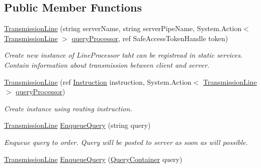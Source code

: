 \subsection*{Public Member Functions}
\begin{DoxyCompactItemize}
\item 
\mbox{\hyperlink{class_pipes_provider_1_1_client_1_1_transmission_line_a8fe76e563974e7380fe2f717e48d694e}{Transmission\+Line}} (string server\+Name, string server\+Pipe\+Name, System.\+Action$<$ \mbox{\hyperlink{class_pipes_provider_1_1_client_1_1_transmission_line}{Transmission\+Line}} $>$ \mbox{\hyperlink{class_pipes_provider_1_1_client_1_1_transmission_line_a86f49118056ad8cb6fe383abb2a350e8}{query\+Processor}}, ref Safe\+Access\+Token\+Handle token)
\begin{DoxyCompactList}\small\item\em Create new instance of Line\+Processor taht can be registread in static services. Contain information about transmission between client and server. \end{DoxyCompactList}\item 
\mbox{\hyperlink{class_pipes_provider_1_1_client_1_1_transmission_line_aa75228335f18b62a772bd43db9587e42}{Transmission\+Line}} (ref \mbox{\hyperlink{class_pipes_provider_1_1_networking_1_1_routing_1_1_instruction}{Instruction}} instruction, System.\+Action$<$ \mbox{\hyperlink{class_pipes_provider_1_1_client_1_1_transmission_line}{Transmission\+Line}} $>$ \mbox{\hyperlink{class_pipes_provider_1_1_client_1_1_transmission_line_a86f49118056ad8cb6fe383abb2a350e8}{query\+Processor}})
\begin{DoxyCompactList}\small\item\em Create instance using routing instruction. \end{DoxyCompactList}\item 
\mbox{\hyperlink{class_pipes_provider_1_1_client_1_1_transmission_line}{Transmission\+Line}} \mbox{\hyperlink{class_pipes_provider_1_1_client_1_1_transmission_line_ac7a9bbb2d71ae7080788b28449b216fc}{Enqueue\+Query}} (string query)
\begin{DoxyCompactList}\small\item\em Enqueue query to order. Query will be posted to server as soon as will possible. \end{DoxyCompactList}\item 
\mbox{\hyperlink{class_pipes_provider_1_1_client_1_1_transmission_line}{Transmission\+Line}} \mbox{\hyperlink{class_pipes_provider_1_1_client_1_1_transmission_line_a0adfc0db736cc9315a6e1c0ea04c42e6}{Enqueue\+Query}} (\mbox{\hyperlink{struct_pipes_provider_1_1_client_1_1_query_container}{Query\+Container}} query)

\end{DoxyCompactItemize}
